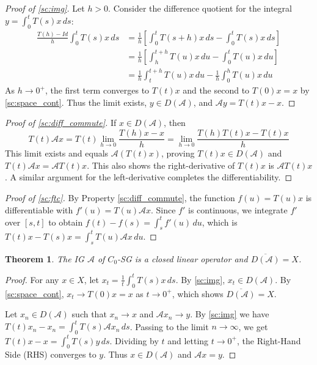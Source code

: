 \documentclass[12pt, oneside]{book}
\newtheorem{theo}{Theorem}[section]
\newcommand{\A}{\mathscr{A}}
\begin{document}
\begin{proof}[Proof of \ref{sc:img}]
Let $h > 0$. Consider the difference quotient for the integral $y = \int_0^t T(s)x \, ds$:
\begin{align*}
\frac{T(h)-Id}{h} \int_0^t T(s)x \, ds &= \frac{1}{h} \left[ \int_0^t T(s+h)x \, ds - \int_0^t T(s)x \, ds \right] \\
&= \frac{1}{h} \left[ \int_h^{t+h} T(u)x \, du - \int_0^t T(u)x \, du \right] \\
&= \frac{1}{h} \int_t^{t+h} T(u)x \, du - \frac{1}{h} \int_0^h T(u)x \, du
\end{align*}
As $h \to 0^+$, the first term converges to $T(t)x$ and the second to $T(0)x = x$ by \ref{sc:space_cont}. Thus the limit exists, $y \in D(\A)$, and $\A y = T(t)x - x$.
\end{proof}

\begin{proof}[Proof of \ref{sc:diff_commute}]
If $x \in D(\A)$, then 
$$
T(t)\A x = T(t) \lim_{h \to 0} \frac{T(h)x-x}{h} = \lim_{h \to 0} \frac{T(h)T(t)x - T(t)x}{h}
$$
This limit exists and equals $\A(T(t)x)$, proving $T(t)x \in D(\A)$ and $T(t)\A x = \A T(t)x$. This also shows the right-derivative of $T(t)x$ is $\A T(t)x$. A similar argument for the left-derivative completes the differentiability.
\end{proof}

\begin{proof}[Proof of \ref{sc:ftc}]
By Property \ref{sc:diff_commute}, the function $f(u) = T(u)x$ is differentiable with $f'(u) = T(u)\A x$. Since $f'$ is continuous, we integrate $f'$ over $[s, t]$ to obtain $f(t) - f(s) = \int_s^t f'(u) \, du$, which is $T(t)x - T(s)x = \int_s^t T(u)\A x \, du$.
\end{proof}

\begin{theo} \label{sc:dense}
The IG $\A$ of $C_0$-SG is a closed linear operator and $\overline{D(\A)} = X$.
\end{theo}

\begin{proof}
For any $x \in X$, let $x_t = \frac{1}{t} \int_0^t T(s)x \, ds$. By \ref{sc:img}, $x_t \in D(\A)$. By \ref{sc:space_cont}, $x_t \to T(0)x = x$ as $t \to 0^+$, which shows $\overline{D(\A)} = X$.

Let $x_n \in D(\A)$ such that $x_n \to x$ and $\A x_n \to y$. By \ref{sc:img} we have $T(t)x_n - x_n = \int_0^t T(s)\A x_n \, ds$. Passing to the limit $n \to \infty$, we get $T(t)x - x = \int_0^t T(s)y \, ds$. Dividing by $t$ and letting $t \to 0^+$, the Right-Hand Side (RHS) converges to $y$. Thus $x \in D(\A)$ and $\A x = y$.
\end{proof}
\end{document}
